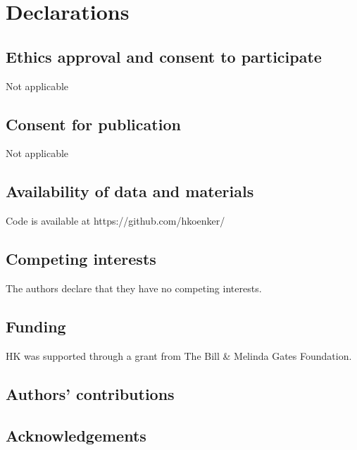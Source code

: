 \documentclass[review,
3p]{elsarticle} %
\begin{document}
\hypertarget{declarations}{%
\section{Declarations}\label{declarations}}

\hypertarget{ethics-approval-and-consent-to-participate}{%
\subsection{Ethics approval and consent to
participate}\label{ethics-approval-and-consent-to-participate}}

Not applicable

\hypertarget{consent-for-publication}{%
\subsection{Consent for publication}\label{consent-for-publication}}

Not applicable

\hypertarget{availability-of-data-and-materials}{%
\subsection{Availability of data and
materials}\label{availability-of-data-and-materials}}

Code is available at https://github.com/hkoenker/

\hypertarget{competing-interests}{%
\subsection{Competing interests}\label{competing-interests}}

The authors declare that they have no competing interests.

\hypertarget{funding}{%
\subsection{Funding}\label{funding}}

HK was supported through a grant from The Bill \& Melinda Gates
Foundation.

\hypertarget{authors-contributions}{%
\subsection{Authors' contributions}\label{authors-contributions}}

\hypertarget{acknowledgements}{%
\subsection{Acknowledgements}\label{acknowledgements}}
\end{document}
